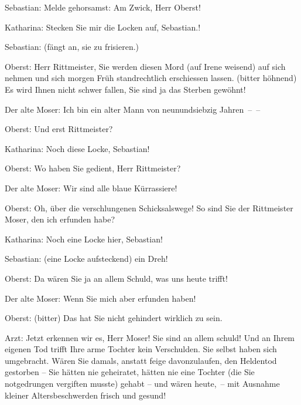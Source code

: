 \pstart
           Sebastian: Melde gehorsamst: Am Zwick, Herr Oberst!\pend
           
\pstart
           Katharina: Stecken Sie mir die Locken auf, Sebastian.!\pend
           
\pstart
           Sebastian: (fängt an, sie zu frisieren.)\pend
           
\pstart
           Oberst: Herr Rittmeister, Sie werden diesen Mord (auf Irene weisend) auf sich nehmen
               und sich morgen Früh standrechtlich erschiessen lassen. (bitter höhnend) Es wird
               Ihnen nicht schwer fallen, Sie sind ja das Sterben gewöhnt!\pend
           
\pstart
           Der alte Moser: Ich bin ein alter Mann von neunundsiebzig Jahren – –\pend
           
\pstart
           {\pb}Oberst: Und erst Rittmeister?\pend
           
\pstart
           Katharina: Noch diese Locke, Sebastian!\pend
           
\pstart
           Oberst: Wo haben Sie gedient, Herr Rittmeister?\pend
           
\pstart
           Der alte Moser: Wir sind alle blaue Kürrassiere!\pend
           
\pstart
           Oberst: Oh, über die verschlungenen Schicksalswege! So sind Sie der Rittmeister
               Moser, den ich erfunden habe?\pend
           
\pstart
           Katharina: Noch eine Locke hier, Sebastian!\pend
           
\pstart
           Sebastian: (eine Locke aufsteckend)  ein Dreh!\pend
           
\pstart
           Oberst: Da wären Sie ja an allem Schuld, was uns heute trifft!\pend
           
\pstart
           \introOben{}\introOben{}Der alte Moser: Wenn Sie mich aber erfunden haben!\pend
           
\pstart
           Oberst: (bitter) Das hat Sie nicht gehindert wirklich zu sein.\pend
           
\pstart
           Arzt: Jetzt erkennen wir es, Herr Moser! Sie sind an allem schuld! Und an Ihrem
               eigenen Tod trifft Ihre arme Tochter kein Verschulden. Sie selbst haben sich
               umgebracht. Wären Sie damals, anstatt feige davonzulaufen, den Heldentod gestorben –
               Sie hätten nie geheiratet, hätten nie eine Tochter (die Sie notgedrungen vergiften
               musste) gehabt – und wären heute, – mit Ausnahme kleiner Altersbeschwerden frisch und
               gesund!\pend
           

